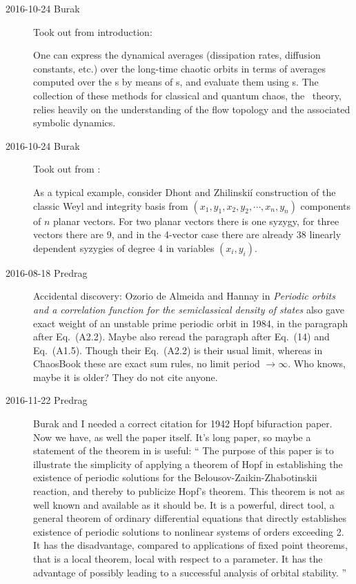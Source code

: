 \begin{description}
\item[2016-10-24 Burak] Took out from introduction:

One can express the dynamical averages
(dissipation rates,
diffusion constants, etc.) over the long-time chaotic orbits in terms of
averages computed over the \po s by means of {\Fd s}, and evaluate them
using \cycForm s. The collection of these methods for
classical and quantum chaos, the \po\  theory, relies heavily on the
understanding of the flow topology and the associated symbolic dynamics.

\item[2016-10-24 Burak] Took out from :

As a typical example, consider Dhont and
Zhilinski\'i construction of the classic Weyl
 and  integrity basis from
$(x_1,y_1,x_2,y_2,\cdots,x_n,y_n)$ components of $n$ planar vectors. For
two planar vectors there is one syzygy, for three vectors there are 9,
and in the 4-vector case there are already 38 linearly dependent syzygies
of degree 4 in variables $(x_i, y_i)$.

\item[2016-08-18 Predrag] Accidental discovery: Ozorio de Almeida and
Hannay in {\em Periodic orbits and a correlation function for
the semiclassical density of states} also gave {exact} weight of an unstable
prime periodic orbit in 1984, in the paragraph after Eq.~(A2.2). Maybe also
reread the paragraph after Eq.~(14) and Eq.~(A1.5). Though their Eq.~(A2.2)
is their usual limit, whereas in ChaosBook these are exact sum rules, no
limit period $ \to \infty$. Who knows, maybe it is older? They do not cite
anyone.

\item[2016-11-22 Predrag]                                       \toCB
Burak and I needed a correct citation for 1942 Hopf bifuraction
paper. Now we have, as well the paper itself.
It's long paper, so maybe a statement of the theorem in  is useful:
``
The purpose of this paper is to illustrate the simplicity of applying a
theorem of Hopf in establishing the existence of periodic
solutions for the Belousov-Zaikin-Zhabotinskii reaction, and thereby to
publicize Hopf's theorem. This theorem is not as well known and available as
it should be. It is a powerful, direct tool, a general theorem of ordinary
differential equations that directly establishes existence of periodic
solutions to nonlinear systems of orders exceeding 2. It has the
disadvantage, compared to applications of fixed point theorems, that is a
local theorem, local with respect to a parameter. It has the advantage of
possibly leading to a successful analysis of orbital stability.
''


\end{description}
